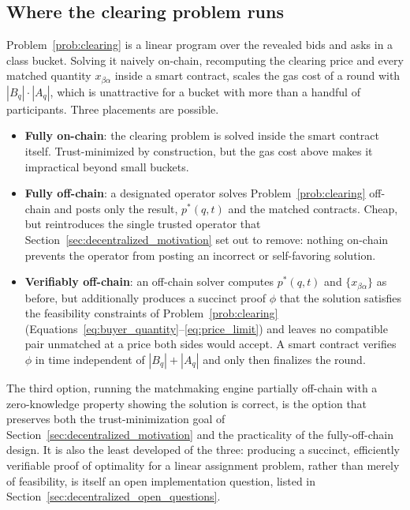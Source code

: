 \subsection{Where the clearing problem runs}
\label{sec:decentralized_matching_engine}

Problem~\ref{prob:clearing} is a linear program over the revealed bids and
asks in a class bucket. Solving it naively on-chain, recomputing the
clearing price and every matched quantity $x_{\beta\alpha}$ inside a smart
contract, scales the gas cost of a round with $|B_q| \cdot |A_q|$, which
is unattractive for a bucket with more than a handful of participants.
Three placements are possible.

\begin{itemize}
  \item \textbf{Fully on-chain}: the clearing problem is solved inside the
    smart contract itself. Trust-minimized by construction, but the gas
    cost above makes it impractical beyond small buckets.

  \item \textbf{Fully off-chain}: a designated operator solves
    Problem~\ref{prob:clearing} off-chain and posts only the result,
    $p^*(q, t)$ and the matched contracts. Cheap, but reintroduces the
    single trusted operator that Section~\ref{sec:decentralized_motivation}
    set out to remove: nothing on-chain prevents the operator from posting
    an incorrect or self-favoring solution.

  \item \textbf{Verifiably off-chain}: an off-chain solver computes
    $p^*(q, t)$ and $\{x_{\beta\alpha}\}$ as before, but additionally
    produces a succinct proof $\phi$ that the solution satisfies the
    feasibility constraints of Problem~\ref{prob:clearing}
    (Equations~\eqref{eq:buyer_quantity}--\eqref{eq:price_limit}) and
    leaves no compatible pair unmatched at a price both sides would
    accept. A smart contract verifies $\phi$ in time independent of
    $|B_q| + |A_q|$ and only then finalizes the round.
\end{itemize}

The third option, running the matchmaking engine partially off-chain with
a zero-knowledge property showing the solution is correct, is the option
that preserves both the trust-minimization goal of
Section~\ref{sec:decentralized_motivation} and the practicality of the
fully-off-chain design. It is also the least developed of the three:
producing a succinct, efficiently verifiable proof of optimality for a
linear assignment problem, rather than merely of feasibility, is itself an
open implementation question, listed in
Section~\ref{sec:decentralized_open_questions}.

